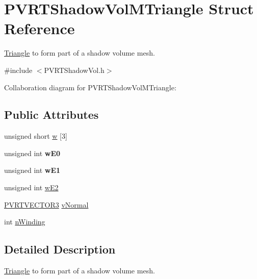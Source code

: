 \hypertarget{struct_p_v_r_t_shadow_vol_m_triangle}{\section{P\+V\+R\+T\+Shadow\+Vol\+M\+Triangle Struct Reference}
\label{struct_p_v_r_t_shadow_vol_m_triangle}
}


\hyperlink{class_triangle}{Triangle} to form part of a shadow volume mesh.  




{\ttfamily \#include $<$P\+V\+R\+T\+Shadow\+Vol.\+h$>$}



Collaboration diagram for P\+V\+R\+T\+Shadow\+Vol\+M\+Triangle\+:
\subsection*{Public Attributes}
\begin{DoxyCompactItemize}
\item 
unsigned short \hyperlink{struct_p_v_r_t_shadow_vol_m_triangle_a6be596dd8fcae5d40b641eb237f9a7c2}{w} \mbox{[}3\mbox{]}
\item 
\hypertarget{struct_p_v_r_t_shadow_vol_m_triangle_a1706da980f97c90992727c5103579f26}{unsigned int {\bfseries w\+E0}}\label{struct_p_v_r_t_shadow_vol_m_triangle_a1706da980f97c90992727c5103579f26}

\item 
\hypertarget{struct_p_v_r_t_shadow_vol_m_triangle_a810e2dc510c29670ec48457de2ba0f8b}{unsigned int {\bfseries w\+E1}}\label{struct_p_v_r_t_shadow_vol_m_triangle_a810e2dc510c29670ec48457de2ba0f8b}

\item 
unsigned int \hyperlink{struct_p_v_r_t_shadow_vol_m_triangle_ae8fe2a0a55201e8307281de86d23919c}{w\+E2}
\item 
\hyperlink{struct_p_v_r_t_v_e_c_t_o_r3f}{P\+V\+R\+T\+V\+E\+C\+T\+O\+R3} \hyperlink{struct_p_v_r_t_shadow_vol_m_triangle_abc0e17976aaaef2363c686f60e969b93}{v\+Normal}
\item 
int \hyperlink{struct_p_v_r_t_shadow_vol_m_triangle_a56ad15abef4e469aa0bc95a79dc5c2d7}{n\+Winding}
\end{DoxyCompactItemize}


\subsection{Detailed Description}
\hyperlink{class_triangle}{Triangle} to form part of a shadow volume mesh. 



